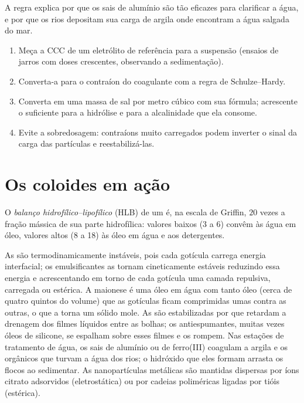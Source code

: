 A regra explica por que os sais de alumínio são tão eficazes para clarificar a água,
e por que os rios depositam sua carga de argila onde encontram a água salgada do mar.

\begin{method}\label{met:b3:colloids:coagulant-dose}
\begin{enumerate}
  \item Meça a CCC de um eletrólito de referência para a suspensão (ensaios de jarros
        com doses crescentes, observando a sedimentação).
  \item Converta-a para o contraíon do coagulante com a regra de Schulze--Hardy.
  \item Converta em uma massa de sal por metro cúbico com sua fórmula; acrescente o
        suficiente para a hidrólise e para a alcalinidade que ela consome.
  \item Evite a sobredosagem: contraíons muito carregados podem inverter o sinal da
        carga das partículas e reestabilizá-las.
\end{enumerate}
\end{method}

\section{Os coloides em ação}

\begin{definition}\label{def:b3:colloids:hlb}
O \emph{balanço hidrofílico--lipofílico}
(HLB) de um  é, na escala de Griffin, $20$ vezes a fração mássica
de sua parte hidrofílica: valores baixos (3 a 6) convêm às  água em óleo,
valores altos (8 a 18) às  óleo em água e aos detergentes.
\end{definition}

As  são termodinamicamente instáveis, pois cada gotícula carrega energia
interfacial; os emulsificantes as tornam cineticamente estáveis reduzindo essa
energia e acrescentando em torno de cada gotícula uma camada repulsiva, carregada ou
estérica. A maionese é uma  óleo em água com tanto óleo (cerca de quatro
quintos do volume) que as gotículas ficam comprimidas umas contra as outras, o que a
torna um sólido mole. As  são estabilizadas por  que retardam a
drenagem dos filmes líquidos entre as bolhas; os antiespumantes, muitas vezes óleos de
silicone, se espalham sobre esses filmes e os rompem. Nas estações de tratamento de
água, os sais de alumínio ou de ferro(III) coagulam a argila e os  orgânicos
que turvam a água dos rios; o hidróxido que eles formam arrasta os flocos ao
sedimentar. As nanopartículas metálicas são mantidas dispersas por íons citrato
adsorvidos (eletrostática) ou por cadeias poliméricas ligadas por tióis (estérica).

